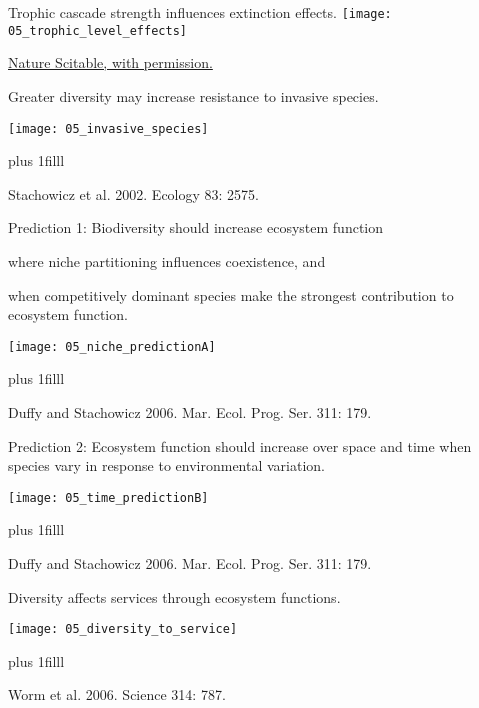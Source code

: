 \documentclass[t]{beamer}
\begin{document}
%
\begin{frame}[t]{Trophic cascade strength influences extinction effects.}
	\centering
	\texttt{[image: 05\_trophic\_level\_effects]}
	
	\vfilll
	
	\hfill \tiny \href{http://www.nature.com/scitable/knowledge/library/biodiversity-and-ecosystem-services-is-it-the-96677163}{\textcopyright Nature Scitable, with permission.}
\end{frame}
%
%
\begin{frame}[t]{Greater diversity may increase resistance to invasive species.}

	\centering\texttt{[image: 05\_invasive\_species]}
	
	\vskip0pt plus 1filll
	
	\hfill \tiny Stachowicz et al. 2002. Ecology 83: 2575.
\end{frame}
%
\begin{frame}[t]{Prediction 1: Biodiversity should increase ecosystem function }
	\begin{multicols}{2}
		where niche partitioning influences coexistence, and
		
		\vspace*{2\baselineskip}
		
		when competitively dominant species make the strongest contribution to ecosystem function.
		
	\columnbreak
		\texttt{[image: 05\_niche\_predictionA]}
		
	\end{multicols}
	\vskip0pt plus 1filll
	
	\hfill\tiny Duffy and Stachowicz 2006. Mar. Ecol. Prog. Ser. 311: 179.
\end{frame}
%
\begin{frame}[t]{Prediction 2: Ecosystem function should increase over space and time when species vary in response to environmental variation.}
	
	\centering	
	
	\texttt{[image: 05\_time\_predictionB]}
	
	\vskip0pt plus 1filll
	
	\hfill\tiny Duffy and Stachowicz 2006. Mar. Ecol. Prog. Ser. 311: 179.

\end{frame}
%
\begin{frame}[t]{Diversity affects services through ecosystem functions.}

		\texttt{[image: 05\_diversity\_to\_service]}
		
	\vskip0pt plus 1filll
	
	\hfill\tiny Worm et al. 2006. Science 314: 787.

\end{frame}
\end{document}
